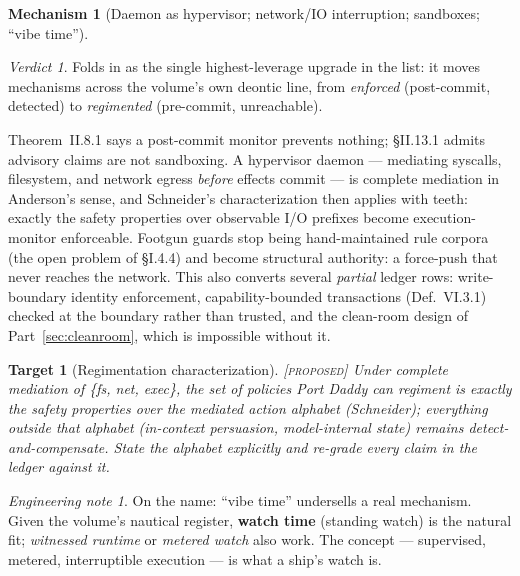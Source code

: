 \documentclass[11pt,a4paper]{article}
\newtheorem{target}{Target}[section]
\theoremstyle{definition}
\newtheorem{mech}{Mechanism}
\theoremstyle{remark}
\newtheorem*{verdict}{Verdict}
\newtheorem*{note}{Engineering note}
\newcommand{\grade}[1]{\textsc{[#1]}}
\begin{document}
\begin{mech}[Daemon as hypervisor; network/IO interruption; sandboxes; ``vibe time'']
\begin{verdict} Folds in as the single highest-leverage upgrade in the list: it moves mechanisms across the volume's own deontic line, from \emph{enforced} (post-commit, detected) to \emph{regimented} (pre-commit, unreachable). \end{verdict}
Theorem~II.8.1 says a post-commit monitor prevents nothing; \S II.13.1 admits advisory claims are not sandboxing. A hypervisor daemon --- mediating syscalls, filesystem, and network egress \emph{before} effects commit --- is complete mediation in Anderson's sense, and Schneider's characterization then applies with teeth: exactly the safety properties over observable I/O prefixes become execution-monitor enforceable. Footgun guards stop being hand-maintained rule corpora (the open problem of \S I.4.4) and become structural authority: a force-push that never reaches the network. This also converts several \emph{partial} ledger rows: write-boundary identity enforcement, capability-bounded transactions (Def.~VI.3.1) checked at the boundary rather than trusted, and the clean-room design of Part~\ref{sec:cleanroom}, which is impossible without it.
\begin{target}[Regimentation characterization]\grade{proposed} Under complete mediation of \{fs, net, exec\}, the set of policies Port Daddy can regiment is exactly the safety properties over the mediated action alphabet (Schneider); everything outside that alphabet (in-context persuasion, model-internal state) remains detect-and-compensate. State the alphabet explicitly and re-grade every claim in the ledger against it. \end{target}
\begin{note} On the name: ``vibe time'' undersells a real mechanism. Given the volume's nautical register, \textbf{watch time} (standing watch) is the natural fit; \emph{witnessed runtime} or \emph{metered watch} also work. The concept --- supervised, metered, interruptible execution --- is what a ship's watch is. \end{note}
\end{mech}
\end{document}
